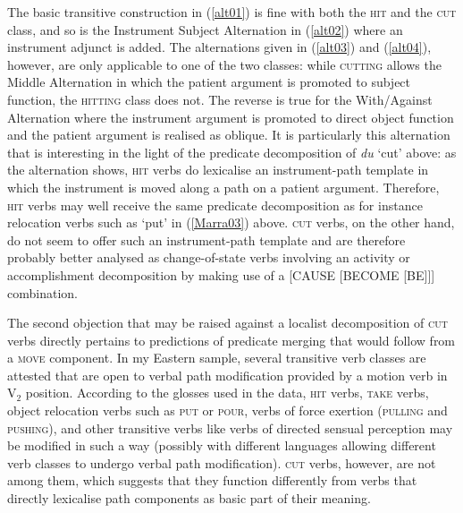 The basic transitive construction in (\ref{alt01}) is fine with both the \textsc{hit} and the \textsc{cut} class, and so is the Instrument Subject Alternation in (\ref{alt02}) where an instrument adjunct is added. The alternations given in (\ref{alt03}) and (\ref{alt04}), however, are only applicable to one of the two classes: while \textsc{cutting} allows the Middle Alternation in which the patient argument is promoted to subject function, the \textsc{hitting} class does not. The reverse is true for the With/Against Alternation where the instrument argument is promoted to direct object function and the patient argument is realised as oblique. It is particularly this alternation that is interesting in the light of the predicate decomposition of  \textit{du} `cut' above: as the alternation shows, \textsc{hit} verbs do lexicalise an instrument-path template in which the instrument is moved along a path on a patient argument. Therefore, \textsc{hit} verbs may well receive the same predicate decomposition as for instance relocation verbs such as `put' in (\ref{Marra03}) above. \textsc{cut} verbs, on the other hand, do not seem to offer such an instrument-path template and are therefore probably better analysed as change-of-state verbs involving an activity or accomplishment decomposition by making use of a [CAUSE [BECOME [BE]]] combination.

The second objection that may be raised against a localist decomposition of \textsc{cut} verbs directly pertains to  predictions of predicate merging that would follow from a \textsc{move} component. In my Eastern  sample, several transitive verb classes are attested that are open to verbal path modification provided by a motion verb in V$_2$ position. According to the glosses used in the data, \textsc{hit} verbs, \textsc{take} verbs, object relocation verbs such as \textsc{put} or \textsc{pour}, verbs of force exertion (\textsc{pulling} and \textsc{pushing}), and other transitive verbs like verbs of directed sensual perception may be modified in such a way (possibly with different languages allowing different verb classes to undergo verbal path modification). \textsc{cut} verbs, however, are not among them, which suggests that they function differently from verbs that directly lexicalise path components as basic part of their meaning.

